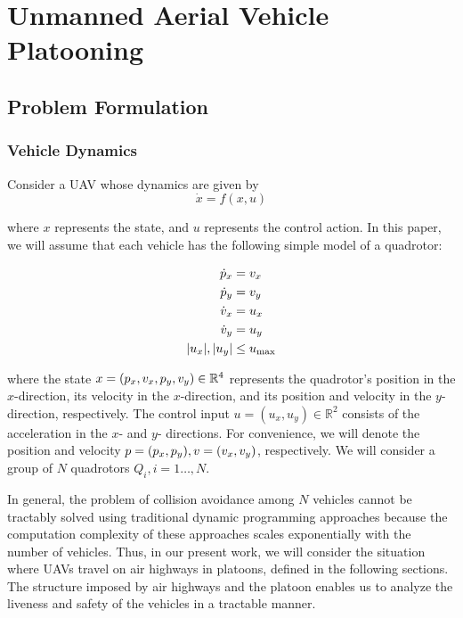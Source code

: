 \section{Unmanned Aerial Vehicle Platooning \label{sec:platooning}}
\subsection{Problem Formulation}
\subsubsection{Vehicle Dynamics}
Consider a UAV whose dynamics are given by
\begin{equation}
\dot{x} = f(x,u)
\end{equation}

\noindent where $x$ represents the state, and $u$ represents the control action. In this paper, we will assume that each vehicle has the following simple model of a quadrotor:

\begin{equation} \label{eq:dyn}
\begin{aligned}
\dot{p}_x &= v_x \\
\dot{p}_y &= v_y  \\
\dot{v}_x &= u_x \\
\dot{v}_y &= u_y \\
|u_x|,|u_y| &\le u_\text{max}
\end{aligned}
\end{equation}

\noindent where the state $x=(p_x, v_x, p_y, v_y)\in\mathbb{R}^4$ represents the quadrotor's position in the $x$-direction, its velocity in the $x$-direction, and its position and velocity in the $y$-direction, respectively. The control input $u = (u_x, u_y)\in\mathbb{R}^2$ consists of the acceleration in the $x$- and $y$- directions. For convenience, we will denote the position and velocity $p=(p_x, p_y),v=(v_x,v_y)$, respectively. We will consider a group of $N$ quadrotors $Q_i, i=1\ldots,N$.

In general, the problem of collision avoidance among $N$ vehicles cannot be tractably solved using traditional dynamic programming approaches because the computation complexity of these approaches scales exponentially with the number of vehicles. Thus, in our present work, we will consider the situation where UAVs travel on air highways in platoons, defined in the following sections. The structure imposed by air highways and the platoon enables us to analyze the liveness and safety of the vehicles in a tractable manner.

